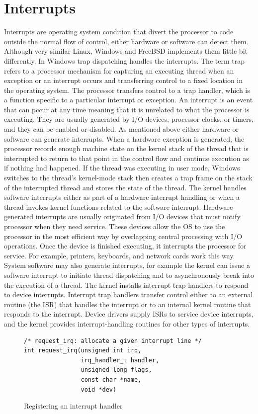 \documentclass[letterpaper,10pt,draftclsnofoot,onecolumn]{IEEEtran}
\begin{document}
\section*{Interrupts}
Interrupts are operating system condition that divert the processor to code outside the normal flow of control, either hardware or software can detect them. Although very similar Linux, Windows and FreeBSD implements them little bit differently. 
In Windows trap dispatching handles the interrupts. The term trap refers to a processor mechanism for capturing an executing thread when an exception or an interrupt occurs and transferring control to a fixed location in the operating system. The processor transfers control to a trap handler, which is a function specific to a particular interrupt or exception.\cite{[1]}
An interrupt is an event that can pccur at any time meaning that it is unrelated to what the processor is executing. They are usually generated by I/O devices, processor clocks, or timers, and they can be enabled or disabled. As mentioned above either hardware or software can generate interrupts.
When a hardware exception is generated, the processor records enough machine state on the kernel stack of the thread that is interrupted to return to that point in the control flow and continue execution as if nothing had happened. If the thread was executing in user mode, Windows switches to the thread's kernel-mode stack then creates a trap frame on the stack of the interrupted thread and stores the state of the thread.\cite{[1]}
The kernel handles software interrupts either as part of a hardware interrupt handling or when a thread invokes kernel functions related to the software interrupt.
Hardware generated interrupts are usually originated from I/O devices that must notify processor when they need service. These devices allow the OS to use the processor in the most efficient way by overlapping central processing with I/O operations. Once the device is finished executing, it interrupts the processor for service. For example, printers, keyboards, and network cards work this way. System software may also generate interrupts, for example the kernel can issue a software interrupt to initiate thread dispatching and to asynchronously break into the execution of a thread.
The kernel installs interrupt trap handlers to respond to device interrupts. Interrupt trap handlers transfer control either to an external routine (the ISR) that handles the interrupt or to an internal kernel routine that responds to the interrupt. Device drivers supply ISRs to service device interrupts, and the kernel provides interrupt-handling routines for other types of interrupts.\cite{[1]}
\begin{figure}[H]
\caption{Registering an interrupt handler}
\begin{lstlisting}
/* request_irq: allocate a given interrupt line */
int request_irq(unsigned int irq,
				irq_handler_t handler,
				unsigned long flags,
				const char *name,
				void *dev)
\end{lstlisting} \cite{linux}
\end{figure}
\end{document}
